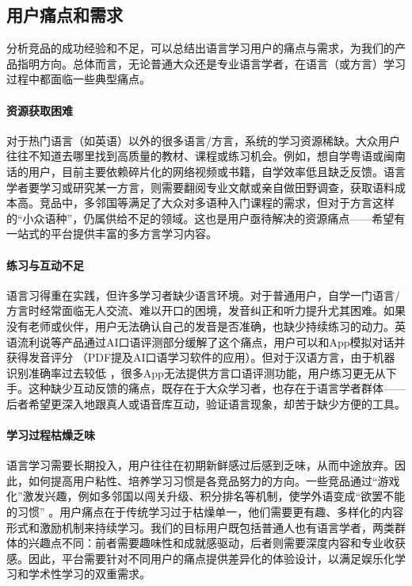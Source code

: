 \subsection{用户痛点和需求}
分析竞品的成功经验和不足，可以总结出语言学习用户的痛点与需求，为我们的产品指明方向。总体而言，无论普通大众还是专业语言学者，在语言（或方言）学习过程中都面临一些典型痛点。
\paragraph{资源获取困难}
对于热门语言（如英语）以外的很多语言/方言，系统的学习资源稀缺。大众用户往往不知道去哪里找到高质量的教材、课程或练习机会。例如，想自学粤语或闽南话的用户，目前主要依赖碎片化的网络视频或书籍，自学效率低且缺乏反馈。语言学者要学习或研究某一方言，则需要翻阅专业文献或亲自做田野调查，获取语料成本高。竞品中，多邻国等满足了大众对多语种入门课程的需求，但对于方言这样的“小众语种”，仍属供给不足的领域。这也是用户亟待解决的资源痛点——希望有一站式的平台提供丰富的多方言学习内容。

\paragraph{练习与互动不足}
语言习得重在实践，但许多学习者缺少语言环境。对于普通用户，自学一门语言/方言时经常面临无人交流、难以开口的困境，发音纠正和听力提升尤其困难。如果没有老师或伙伴，用户无法确认自己的发音是否准确，也缺少持续练习的动力。英语流利说等产品通过AI口语评测部分缓解了这个痛点，用户可以和App模拟对话并获得发音评分 （PDF提及AI口语学习软件的应用）。但对于汉语方言，由于机器识别准确率过去较低 ，很多App无法提供方言口语评测功能，用户练习更无从下手。这种缺少互动反馈的痛点，既存在于大众学习者，也存在于语言学者群体——后者希望更深入地跟真人或语音库互动，验证语言现象，却苦于缺少方便的工具。

\paragraph{学习过程枯燥乏味}
语言学习需要长期投入，用户往往在初期新鲜感过后感到乏味，从而中途放弃。因此，如何提高用户粘性、培养学习习惯是各竞品努力的方向。一些竞品通过“游戏化”激发兴趣，例如多邻国以闯关升级、积分排名等机制，使学外语变成“欲罢不能的习惯”  。用户痛点在于传统学习过于枯燥单一，他们需要更有趣、多样化的内容形式和激励机制来持续学习。我们的目标用户既包括普通人也有语言学者，两类群体的兴趣点不同：前者需要趣味性和成就感驱动，后者则需要深度内容和专业收获感。因此，平台需要针对不同用户的痛点提供差异化的体验设计，以满足娱乐化学习和学术性学习的双重需求。


